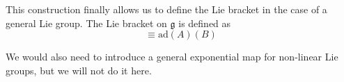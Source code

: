   \begin{definition}
    This construction finally allows us to define the Lie bracket in the case of a general Lie group. The Lie bracket on $\mathfrak{g}$ is defined as 
    \begin{equation}
      [A,B] \equiv \text{ad} (A) (B)
    \end{equation}
  \end{definition}

  We would also need to introduce a general exponential map for non-linear Lie groups, but we will not do it here. 

